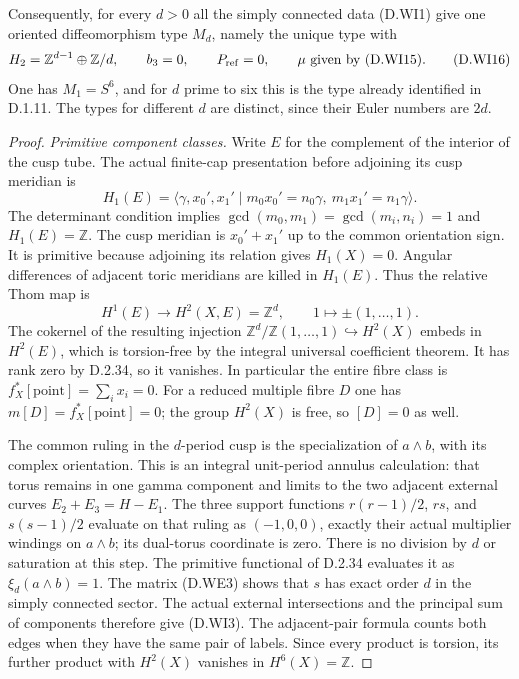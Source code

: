 Consequently, for every $d>0$ all the simply connected data
(D.WI1) give one oriented diffeomorphism type $M_d$, namely
the unique type with
\[
 H_2=\mathbb Z^{d-1}\oplus\mathbb Z/d,\qquad b_3=0,\qquad
 P_{\rm ref}=0,\qquad \mu\ \text{given by (D.WI15)}.
 \tag{D.WI16}
\]
One has $M_1=S^6$, and for $d$ prime to six this is the
type already identified in D.1.11. The types for different
$d$ are distinct, since their Euler numbers are $2d$.

\begin{proof}
\emph{Primitive component classes.}
Write $E$ for the complement of the interior of the cusp tube.
The actual finite-cap presentation before adjoining its cusp meridian is
\[
 H_1(E)=
 \langle\gamma,x_0',x_1'\mid m_0x_0'=n_0\gamma,\ 
                                   m_1x_1'=n_1\gamma\rangle .
\]
The determinant condition implies
$\gcd(m_0,m_1)=\gcd(m_i,n_i)=1$ and $H_1(E)=\mathbb Z$.
The cusp meridian is $x_0'+x_1'$ up to the common orientation sign.
It is primitive because adjoining its relation gives $H_1(X)=0$.
Angular differences of adjacent toric meridians are killed in
$H_1(E)$.  Thus the relative Thom map is
\[
 H^1(E)\longrightarrow H^2(X,E)=\mathbb Z^d,\qquad
                   1\longmapsto\pm(1,\ldots,1).
 \tag{D.WI4}
\]
The cokernel of the resulting injection
$\mathbb Z^d/\mathbb Z(1,\ldots,1)\hookrightarrow H^2(X)$
embeds in $H^2(E)$, which is torsion-free by the integral universal
coefficient theorem.  It has rank zero by D.2.34, so it vanishes.
In particular the entire fibre class is
$f_X^*[\mathrm{point}]=\sum_i x_i=0$.
For a reduced multiple fibre $D$ one has
$m[D]=f_X^*[\mathrm{point}]=0$; the group $H^2(X)$ is free,
so $[D]=0$ as well.

The common ruling in the $d$-period cusp is the specialization
of $a\wedge b$, with its complex orientation.  This is an integral
unit-period annulus calculation: that torus remains in one gamma
component and limits to the two adjacent external curves
$E_2+E_3=H-E_1$.  The three support functions
$r(r-1)/2$, $rs$, and $s(s-1)/2$ evaluate on that ruling as
$(-1,0,0)$, exactly their actual multiplier windings on
$a\wedge b$; its dual-torus coordinate is zero.
There is no division by $d$ or saturation at this step.
The primitive functional of D.2.34 evaluates it as
$\xi_d(a\wedge b)=1$.  The matrix (D.WE3) shows that $s$ has
exact order $d$ in the simply connected sector.  The actual
external intersections and the principal sum of components
therefore give (D.WI3).  The adjacent-pair formula counts both
edges when they have the same pair of labels.  Since every
product is torsion, its further product with $H^2(X)$ vanishes
in $H^6(X)=\mathbb Z$.


\end{proof}
